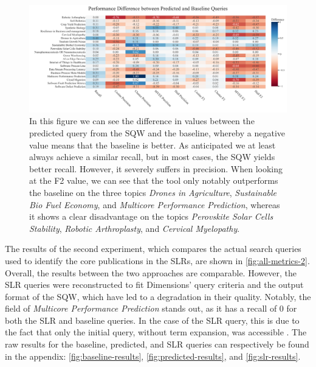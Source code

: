 \begin{figure}[!t]
	\hspace*{-.8cm}	
	\includegraphics[scale=0.45]{pics/eval1_results.pdf}
	\caption[Evaluation Difference: Experiment 1]{In this figure we can see the difference in values between the predicted query from the SQW and the baseline, whereby a negative value means that the baseline is better. As anticipated we at least always achieve a similar recall, but in most cases, the SQW yields better recall. However, it severely suffers in precision. When looking at the F2 value, we can see that the tool only notably outperforms the baseline on the three topics \textit{Drones in Agriculture}, \textit{Sustainable Bio Fuel Economy}, and \textit{Multicore Performance Prediction}, whereas it shows a clear disadvantage on the topics \textit{Perovskite Solar Cells Stability}, \textit{Robotic Arthroplasty}, and \textit{Cervical Myelopathy}.}
	\label{fig:eval1_results}
\end{figure}

The results of the second experiment, which compares the actual search queries used to identify the core publications in the SLRs, are shown in \autoref{fig:all-metrics-2}. Overall, the results between the two approaches are comparable. However, the SLR queries were reconstructed to fit Dimensions' query criteria and the output format of the SQW, which have led to a degradation in their quality. Notably, the field of \textit{Multicore Performance Prediction} stands out, as it has a recall of 0 for both the SLR and baseline queries. In the case of the SLR query, this is due to the fact that only the initial query, without term expansion, was accessible \autocite{Frank2017}. The raw results for the baseline, predicted, and SLR queries can respectively be found in the appendix: \autoref{fig:baseline-results}, \autoref{fig:predicted-results}, and \autoref{fig:slr-results}.  

